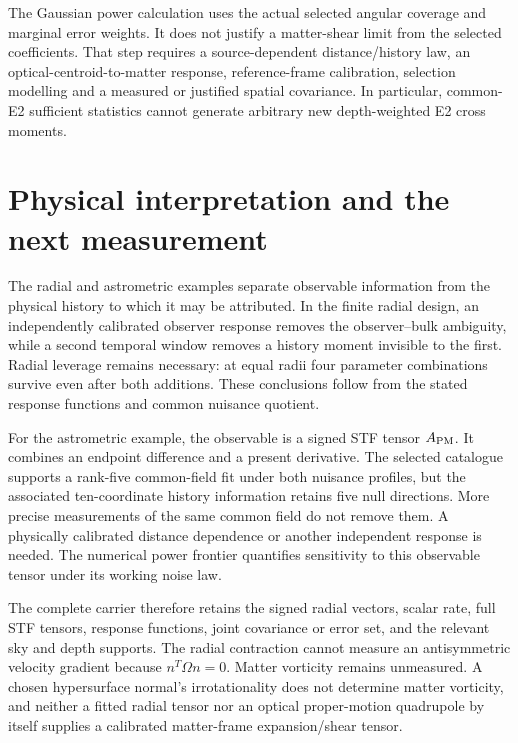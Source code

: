 \documentclass[aps,prd,preprint,onecolumn,notitlepage]{revtex4-2}
\begin{document}
The Gaussian power calculation uses the actual selected angular coverage and marginal error weights. It does not justify a matter-shear limit from the selected coefficients. That step requires a source-dependent distance/history law, an optical-centroid-to-matter response, reference-frame calibration, selection modelling and a measured or justified spatial covariance. In particular, common-E2 sufficient statistics cannot generate arbitrary new depth-weighted E2 cross moments.

\hypertarget{physical-interpretation-and-the-next-measurement}{%
\section{Physical interpretation and the next measurement}\label{physical-interpretation-and-the-next-measurement}}

The radial and astrometric examples separate observable information from the physical history to which it may be attributed. In the finite radial design, an independently calibrated observer response removes the observer--bulk ambiguity, while a second temporal window removes a history moment invisible to the first. Radial leverage remains necessary: at equal radii four parameter combinations survive even after both additions. These conclusions follow from the stated response functions and common nuisance quotient.

For the astrometric example, the observable is a signed STF tensor \(A_{\rm PM}\). It combines an endpoint difference and a present derivative. The selected catalogue supports a rank-five common-field fit under both nuisance profiles, but the associated ten-coordinate history information retains five null directions. More precise measurements of the same common field do not remove them. A physically calibrated distance dependence or another independent response is needed. The numerical power frontier quantifies sensitivity to this observable tensor under its working noise law.

The complete carrier therefore retains the signed radial vectors, scalar rate, full STF tensors, response functions, joint covariance or error set, and the relevant sky and depth supports. The radial contraction cannot measure an antisymmetric velocity gradient because \(n^T\Omega n=0\). Matter vorticity remains unmeasured. A chosen hypersurface normal's irrotationality does not determine matter vorticity, and neither a fitted radial tensor nor an optical proper-motion quadrupole by itself supplies a calibrated matter-frame expansion/shear tensor.
\end{document}
